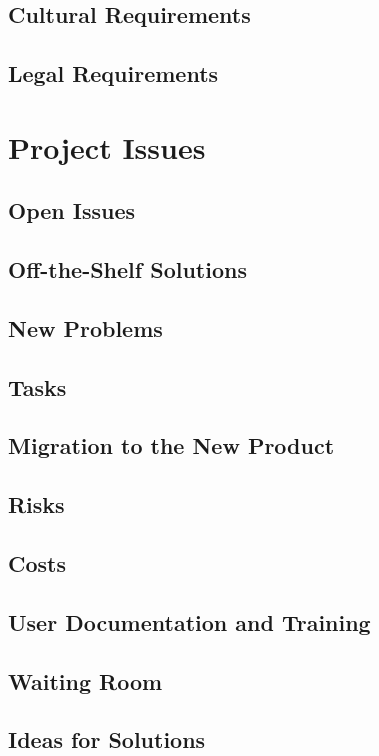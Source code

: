 \documentclass[12pt]{report}
\begin{document}
\section{Cultural Requirements}\label{sec:Cultural}
\section{Legal Requirements}\label{sec:Legal}

\chapter{Project Issues}\label{ch:issues}
\section{Open Issues}\label{sec:issues}
\section{Off-the-Shelf Solutions}\label{sec:solutions}
\section{New Problems}\label{sec:NewProblems}
\section{Tasks}\label{sec:Tasks}
\section{Migration to the New Product}\label{sec:Migration}
\section{Risks}\label{sec:Risks}
\section{Costs}\label{sec:Costs}
\section{User Documentation and Training}\label{sec:UserDoc}
\section{Waiting Room}\label{sec:Waiting}
\section{Ideas for Solutions}\label{sec:Solutions}
\end{document}
